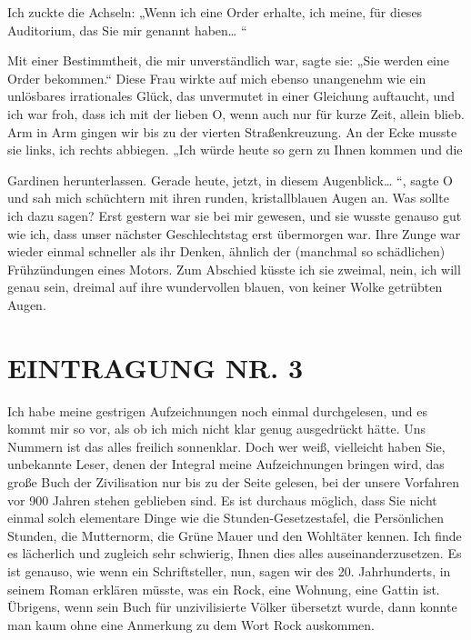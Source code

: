 Ich zuckte die Achseln: „Wenn ich eine Order erhalte, ich meine,
für dieses Auditorium, das Sie mir genannt haben\ldots{} “

Mit einer Bestimmtheit, die mir unverständlich war, sagte sie: „Sie
werden eine Order bekommen.“ Diese Frau wirkte auf mich ebenso
unangenehm wie ein unlösbares irrationales Glück, das unvermutet in
einer Gleichung auftaucht, und ich war froh, dass ich mit der
lieben O, wenn auch nur für kurze Zeit, allein blieb. Arm in Arm
gingen wir bis zu der vierten Straßenkreuzung. An der Ecke musste
sie links, ich rechts abbiegen. „Ich würde heute so gern zu Ihnen
kommen und die

Gardinen herunterlassen. Gerade heute, jetzt, in diesem
Augenblick\ldots{} “, sagte O und sah mich schüchtern mit ihren runden,
kristallblauen Augen an. Was sollte ich dazu sagen? Erst gestern
war sie bei mir gewesen, und sie wusste genauso gut wie ich, dass
unser nächster Geschlechtstag erst übermorgen war. Ihre Zunge war
wieder einmal schneller als ihr Denken, ähnlich der (manchmal so
schädlichen) Frühzündungen eines Motors. Zum Abschied küsste ich
sie zweimal, nein, ich will genau sein, dreimal auf ihre
wundervollen blauen, von keiner Wolke getrübten Augen.

\section{EINTRAGUNG NR. 3}

Ich habe meine gestrigen Aufzeichnungen noch einmal durchgelesen,
und es kommt mir so vor, als ob ich mich nicht klar genug
ausgedrückt hätte. Uns Nummern ist das alles freilich sonnenklar.
Doch wer weiß, vielleicht haben Sie, unbekannte Leser, denen der
Integral meine Aufzeichnungen bringen wird, das große Buch der
Zivilisation nur bis zu der Seite gelesen, bei der unsere Vorfahren
vor 900 Jahren stehen geblieben sind. Es ist durchaus möglich, dass
Sie nicht einmal solch elementare Dinge wie die
Stunden-Gesetzestafel, die Persönlichen Stunden, die Mutternorm,
die Grüne Mauer und den Wohltäter kennen. Ich finde es lächerlich
und zugleich sehr schwierig, Ihnen dies alles auseinanderzusetzen.
Es ist genauso, wie wenn ein Schriftsteller, nun, sagen wir des 20.
Jahrhunderts, in seinem Roman erklären müsste, was ein Rock, eine
Wohnung, eine Gattin ist. Übrigens, wenn
sein Buch für unzivilisierte Völker übersetzt wurde, dann konnte
man kaum ohne eine Anmerkung zu dem Wort Rock auskommen.

